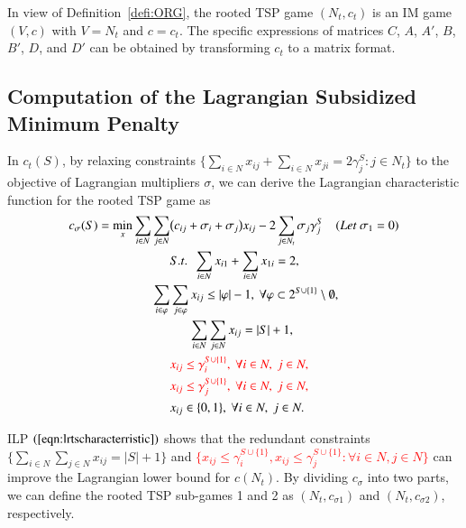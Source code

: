 \documentclass[authoryear,review,12pt]{elsarticle}
\begin{document}
In view of Definition~\ref{defi:ORG}, the rooted TSP game $ (N_t,c_{t})$ is an IM game $(V,c)$ with $V=N_t$ and $c = c_{t}$. The specific expressions of matrices $C$, $A$, $A'$, $B$, $B'$, $D$, and $D'$ can be obtained by transforming $c_{t}$ to a matrix format.



\subsection{Computation of the Lagrangian Subsidized Minimum Penalty}\label{section:LRBTSP}
In $c_{t}(S)$, by relaxing constraints $\big\{ \sum_{i \in N}x_{ij} + \sum_{i \in N}x_{ji} = 2\gamma_j^S: j \in N_t \big\}$ to the objective of Lagrangian multipliers $\sigma$, we can derive the Lagrangian characteristic function for the rooted TSP game as
\begin{eqnarray}\label{eqn:lrtscharacterristic}
\begin{aligned}
c_{\sigma}(S) = \min_{x} \sum_{i \in N} \sum_{j \in N} &\big(c_{ij} + \sigma_i + \sigma_j \big)x_{ij} - 2\sum_{j \in N_t} \sigma_j\gamma_j^S ~~~~(Let~\sigma_1 = 0) \\
&S.t.~~\sum_{i \in N}x_{i1} + \sum_{i \in N}x_{1i} = 2,\\
\sum_{i \in \varphi} &\sum_{j \in \varphi} x_{ij} \leq |\varphi| - 1, ~\forall \varphi \subset 2^{S \cup \{1\}} \setminus \emptyset,\\
&~~~~~~\sum_{i \in N} \sum_{j \in N} x_{ij} = |S|+1,\\
&\textcolor{red}{x_{ij} \leq \gamma_i^{S\cup\{1\}},~\forall i \in N,~ j \in N,}\\
&\textcolor{red}{x_{ij} \leq \gamma_j^{S\cup\{1\}},~\forall i \in N,~ j \in N,}\\
&x_{ij} \in \{0,1\}, ~\forall i \in N, ~j \in N.
\end{aligned}
\end{eqnarray}

ILP $(\ref{eqn:lrtscharacterristic})$ shows that the redundant constraints $\big\{ \sum_{i \in N} \sum_{j \in N} x_{ij} = |S|+1 \big\}$ and \textcolor{red}{$\big\{
x_{ij} \leq \gamma_i^{S\cup\{1\}}, x_{ij} \leq \gamma_j^{S\cup\{1\}} :\forall i \in N, j \in N \big\}$} can improve the Lagrangian lower bound for $c(N_t)$.
By dividing $c_{\sigma}$ into two parts, we can define the rooted TSP sub-games 1 and 2 as $(N_t,c_{\sigma1})$ and $(N_t,c_{\sigma2})$, respectively.
\end{document}

